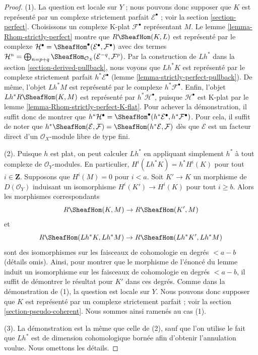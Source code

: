 \begin{proof}

(1). La question est locale sur $Y$ ; nous pouvons donc supposer que
$K$ est représenté par un complexe strictement parfait
$\mathcal{E}^\bullet$ ; voir la section \ref{section-perfect}. Choisissons un complexe K-plat $\mathcal{F}^\bullet$ représentant $M$. Le lemme \ref{lemma-Rhom-strictly-perfect} montre que
$R\SheafHom(K, L)$ est représenté par le complexe
$\mathcal{H}^\bullet =
\SheafHom^\bullet(\mathcal{E}^\bullet, \mathcal{F}^\bullet)$
avec des termes $\mathcal{H}^n = \bigoplus\nolimits_{n = p + q}
\SheafHom_{\mathcal{O}_X}(\mathcal{E}^{-q}, \mathcal{F}^p)$. Par la construction de $Lh^*$ dans la section \ref{section-derived-pullback},
nous voyons que $Lh^*K$ est représenté par le complexe strictement parfait
$h^*\mathcal{E}^\bullet$ (lemme \ref{lemma-strictly-perfect-pullback}). De même, l'objet $Lh^*M$ est représenté par le complexe $h^*\mathcal{F}^\bullet$. Enfin, l'objet $Lh^*R\SheafHom(K, M)$
est représenté par $h^*\mathcal{H}^\bullet$, puisque
$\mathcal{H}^\bullet$ est K-plat par le lemme \ref{lemma-Rhom-strictly-perfect-K-flat}. Pour achever la démonstration, il suffit donc de montrer que
$h^*\mathcal{H}^\bullet =
\SheafHom^\bullet(h^*\mathcal{E}^\bullet, h^*\mathcal{F}^\bullet)$. Pour cela, il suffit de noter que
$h^*\SheafHom(\mathcal{E}, \mathcal{F}) =
\SheafHom(h^*\mathcal{E}, \mathcal{F})$
dès que $\mathcal{E}$ est un facteur direct d'un
$\mathcal{O}_X$-module libre de type fini.

\medskip\noindent

(2). Puisque $h$ est plat, on peut calculer $Lh^*$
en appliquant simplement $h^*$ à tout complexe de $\mathcal{O}_Y$-modules. En particulier, $H^i(Lh^*K) = h^*H^i(K)$ pour tout $i \in \mathbf{Z}$. Supposons que $H^i(M) = 0$ pour $i < a$. Soit $K' \to K$ un morphisme de $D(\mathcal{O}_Y)$ induisant un isomorphisme
$H^i(K') \to H^i(K)$ pour tout $i \geq b$. Alors les morphismes correspondants
$$
R\SheafHom(K, M) \to R\SheafHom(K', M)
$$
et
$$
R\SheafHom(Lh^*K, Lh^*M) \to R\SheafHom(Lh^*K', Lh^*M)
$$
sont des isomorphismes sur les faisceaux de cohomologie en degrés $< a - b$ (détails omis). Ainsi, pour montrer que le morphisme de l'énoncé du lemme induit un isomorphisme sur les faisceaux de cohomologie en degrés $< a - b$, il suffit de démontrer le résultat pour $K'$ dans ces degrés. Comme dans la démonstration de (1), la question est locale sur $Y$. Nous pouvons donc supposer que $K$ est représenté par un complexe strictement parfait ; voir la section \ref{section-pseudo-coherent}. Nous sommes ainsi ramenés au cas (1).

\medskip\noindent

(3). La démonstration est la même que celle de (2), sauf que l'on utilise le fait que $Lh^*$ est de dimension cohomologique bornée afin d'obtenir l'annulation voulue. Nous omettons les détails.

\end{proof}

